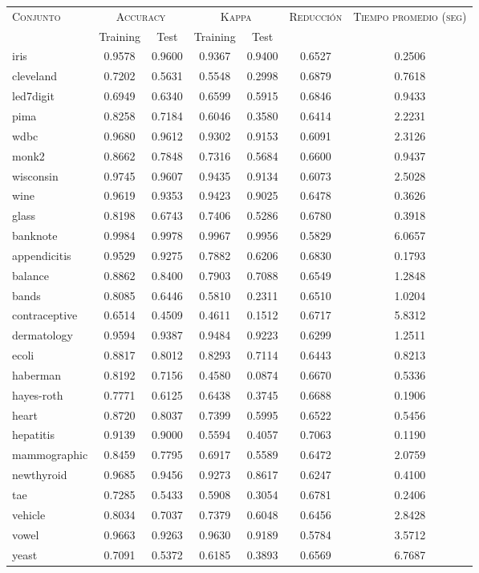 \begin{table}[]
\centering
\begin{tabular}{l c c c c c c}
\hline
\multirow{2}{*}{\textsc{Conjunto}}
	& \multicolumn{2}{c}{\textsc{Accuracy}}
	& \multicolumn{2}{c}{\textsc{Kappa}}
	& \textsc{Reducción}
	& \textsc{Tiempo promedio (seg)} \\
	& Training & Test
	& Training & Test \\ 
\hline
\hline

iris & 0.9578 & 0.9600 & 0.9367 & 0.9400 & 0.6527 & 0.2506 \\
cleveland & 0.7202 & 0.5631 & 0.5548 & 0.2998 & 0.6879 & 0.7618 \\
led7digit & 0.6949 & 0.6340 & 0.6599 & 0.5915 & 0.6846 & 0.9433 \\
pima & 0.8258 & 0.7184 & 0.6046 & 0.3580 & 0.6414 & 2.2231 \\
wdbc & 0.9680 & 0.9612 & 0.9302 & 0.9153 & 0.6091 & 2.3126 \\
monk2 & 0.8662 & 0.7848 & 0.7316 & 0.5684 & 0.6600 & 0.9437 \\
wisconsin & 0.9745 & 0.9607 & 0.9435 & 0.9134 & 0.6073 & 2.5028 \\
wine & 0.9619 & 0.9353 & 0.9423 & 0.9025 & 0.6478 & 0.3626 \\
glass & 0.8198 & 0.6743 & 0.7406 & 0.5286 & 0.6780 & 0.3918 \\
banknote & 0.9984 & 0.9978 & 0.9967 & 0.9956 & 0.5829 & 6.0657 \\
appendicitis & 0.9529 & 0.9275 & 0.7882 & 0.6206 & 0.6830 & 0.1793 \\
balance & 0.8862 & 0.8400 & 0.7903 & 0.7088 & 0.6549 & 1.2848 \\
bands & 0.8085 & 0.6446 & 0.5810 & 0.2311 & 0.6510 & 1.0204 \\
contraceptive & 0.6514 & 0.4509 & 0.4611 & 0.1512 & 0.6717 & 5.8312 \\
dermatology & 0.9594 & 0.9387 & 0.9484 & 0.9223 & 0.6299 & 1.2511 \\
ecoli & 0.8817 & 0.8012 & 0.8293 & 0.7114 & 0.6443 & 0.8213 \\
haberman & 0.8192 & 0.7156 & 0.4580 & 0.0874 & 0.6670 & 0.5336 \\
hayes-roth & 0.7771 & 0.6125 & 0.6438 & 0.3745 & 0.6688 & 0.1906 \\
heart & 0.8720 & 0.8037 & 0.7399 & 0.5995 & 0.6522 & 0.5456 \\
hepatitis & 0.9139 & 0.9000 & 0.5594 & 0.4057 & 0.7063 & 0.1190 \\
mammographic & 0.8459 & 0.7795 & 0.6917 & 0.5589 & 0.6472 & 2.0759 \\
newthyroid & 0.9685 & 0.9456 & 0.9273 & 0.8617 & 0.6247 & 0.4100 \\
tae & 0.7285 & 0.5433 & 0.5908 & 0.3054 & 0.6781 & 0.2406 \\
vehicle & 0.8034 & 0.7037 & 0.7379 & 0.6048 & 0.6456 & 2.8428 \\
vowel & 0.9663 & 0.9263 & 0.9630 & 0.9189 & 0.5784 & 3.5712 \\
yeast & 0.7091 & 0.5372 & 0.6185 & 0.3893 & 0.6569 & 6.7687 \\


\end{tabular}
\end{table}
